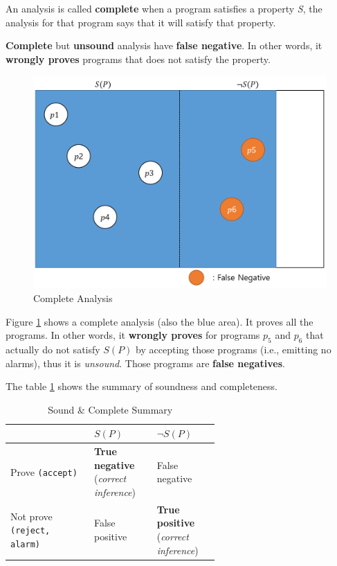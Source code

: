 \documentclass[12pt, twopage]{book}
\begin{document}
An analysis is called \textbf{complete} when a program satisfies a
property \textsl{S}, the analysis for that program says that it will
satisfy that property.


\textbf{Complete} but \textbf{unsound} analysis have \textbf{false
  negative}. In other words, it \textbf{wrongly proves} programs that
does not satisfy the property.


\begin{figure}[h]
  \includegraphics[width=\textwidth]{complete}
  \caption{Complete Analysis}
  \label{fig:complete}
\end{figure}

Figure \ref{fig:complete} shows a complete analysis (also the blue
area). It proves all the programs. In other words, it \textbf{wrongly
  proves} for programs $ p_5 $ and $ p_6 $ that actually do not
satisfy $ S(P) $ by accepting those programs (i.e., emitting no
alarms), thus it is \textit{unsound}. Those programs are \textbf{false
  negatives}.


The table \ref{tab:summary} shows the summary of soundness and
completeness.

\begin{table}[ht]
  \centering
  \caption{Sound \& Complete Summary}
  \label{tab:summary}

  \begin{tabular}[t]{l>{\raggedright}p{0.3\linewidth}>{\raggedright\arraybackslash}p{0.3\linewidth}}
    \hline
    & $ S(P) $ & $ \neg S(P) $ \\
    \hline
    Prove \texttt{(accept)} & \textbf{True negative} (\textsl{correct inference}) & False negative \\
    Not prove \texttt{(reject, alarm)} & False positive & \textbf{True positive} (\textsl{correct inference}) \\
    \hline
  \end{tabular}
\end{table}%
\end{document}
